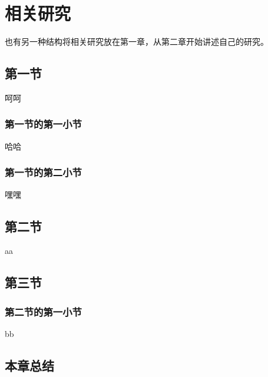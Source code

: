 
\chapter{相关研究}

也有另一种结构将相关研究放在第一章，从第二章开始讲述自己的研究。

\section{第一节}

呵呵

\subsection{第一节的第一小节}

哈哈

\subsection{第一节的第二小节}

嘿嘿

\section{第二节}

aa

\section{第三节}

\subsection{第二节的第一小节}

bb

\section{本章总结}
